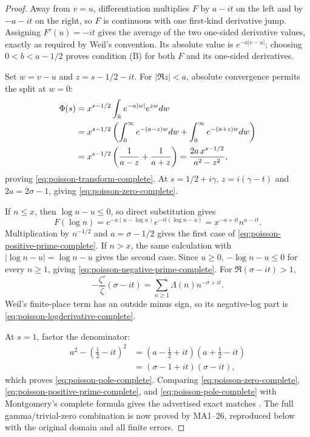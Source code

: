 \begin{proof}
Away from $v=u$, differentiation multiplies $F$ by $a-it$ on the left and by
$-a-it$ on the right, so $F$ is continuous with one first-kind derivative
jump.  Assigning $F'(u)=-it$ gives the average of the two one-sided derivative
values, exactly as required by Weil's convention.  Its absolute value is
$e^{-a|v-u|}$; choosing
$0<b<a-1/2$ proves condition (B) for both $F$ and its one-sided derivatives.

Set $w=v-u$ and $z=s-1/2-it$.  For $|\Re z|<a$, absolute convergence permits
the split at $w=0$:
\begin{align*}
 \Phi(s)
 &=x^{s-1/2}\int_\mathbb R e^{-a|w|}e^{zw}dw\\
 &=x^{s-1/2}
 \left(\int_0^\infty e^{-(a-z)w}dw
       +\int_0^\infty e^{-(a+z)w}dw\right)\\
 &=x^{s-1/2}\left(\frac1{a-z}+\frac1{a+z}\right)
 =\frac{2a\,x^{s-1/2}}{a^2-z^2},
\end{align*}
proving \eqref{eq:poisson-transform-complete}.  At
$s=1/2+i\gamma$, $z=i(\gamma-t)$ and $2a=2\sigma-1$, giving
\eqref{eq:poisson-zero-complete}.

If $n\leq x$, then $\log n-u\leq0$, so direct substitution gives
\[
 F(\log n)=e^{-a(u-\log n)}e^{-it(\log n-u)}
 =x^{-a+it}n^{a-it}.
\]
Multiplication by $n^{-1/2}$ and $a=\sigma-1/2$ gives the first case of
\eqref{eq:poisson-positive-prime-complete}.  If $n>x$, the same calculation
with $|\log n-u|=\log n-u$ gives the second case.  Since $u\geq0$,
$-\log n-u\leq0$ for every $n\geq1$, giving
\eqref{eq:poisson-negative-prime-complete}.  For $\Re(\sigma-it)>1$,
\[
 -\frac{\zeta'}{\zeta}(\sigma-it)
 =\sum_{n\geq1}\Lambda(n)n^{-\sigma+it}.
\]
Weil's finite-place term has an outside minus sign, so its negative-log part
is \eqref{eq:poisson-logderivative-complete}.

At $s=1$, factor the denominator:
\begin{align*}
 a^2-(\tfrac12-it)^2
 &=(a-\tfrac12+it)(a+\tfrac12-it)\\
 &=(\sigma-1+it)(\sigma-it),
\end{align*}
which proves \eqref{eq:poisson-pole-complete}.  Comparing
\eqref{eq:poisson-zero-complete},
\eqref{eq:poisson-positive-prime-complete}, and
\eqref{eq:poisson-pole-complete} with Montgomery's complete formula gives
the advertised exact matches
\cite[pp.~185--187, eqs.~(18)--(22)]{montgomery1973}. The full gamma/trivial-zero combination is now proved by MA1--26, reproduced below with the original domain and all finite errors.
\end{proof}


